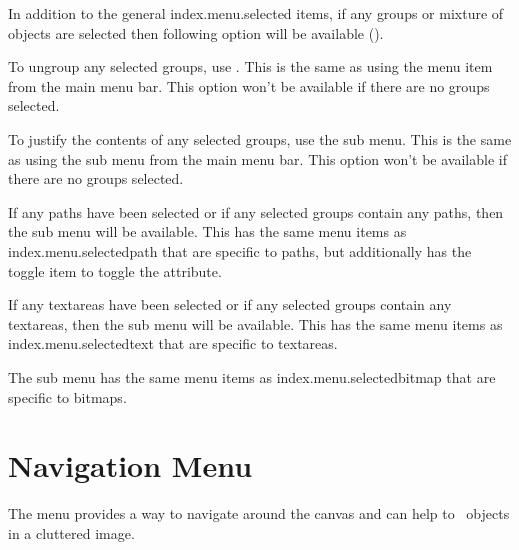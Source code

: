 In addition to the general \gls{index.menu.selected} items,
if any \glspl{group} or mixture of \glspl{object} are selected 
then following option will be available
().


To ungroup any selected \glspl{group}, use
. This is the same as using the
 menu item from the main menu bar.
This option won't be available if there are no
\glspl{group} selected.


To justify the contents of any selected \glspl{group}, use the
 sub menu. This is the same as using the
 sub menu from the main menu bar.
This option won't be available if there are no
\glspl{group} selected.


If any \glspl{path} have been selected or if any selected
\glspl{group} contain any \glspl{path}, then the
 sub menu will be available. This has the same
menu items as \gls{index.menu.selectedpath} that are specific to
\glspl{path}, but additionally has the  toggle
item to toggle the  attribute.


If any \glspl{textarea} have been selected or if any selected
\glspl{group} contain any \glspl{textarea}, then the
 sub menu will be available. This has the same
menu items as \gls{index.menu.selectedtext} that are specific to
\glspl{textarea}.


The  sub menu has the same
menu items as \gls{index.menu.selectedbitmap} that are specific to
\glspl{bitmap}.


\section{Navigation Menu}\label{sec:navigate}


The  menu provides a way to navigate around the
\gls{canvas} and can help to \select\ \glspl*{object}
in a cluttered image.


